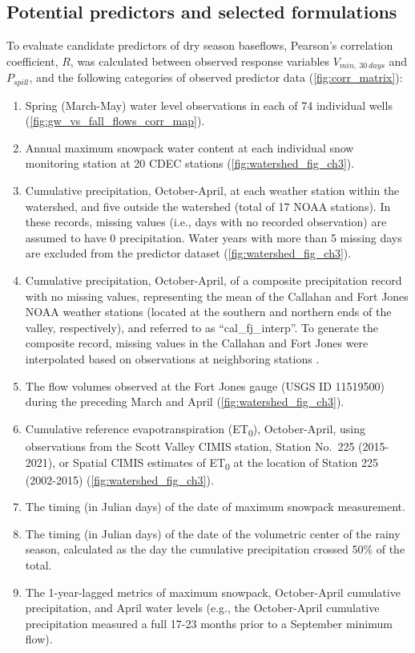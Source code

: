 \documentclass[hess, manuscript]{copernicus}
\providecommand{\tightlist}{%
  \setlength{\itemsep}{0pt}\setlength{\parskip}{0pt}}
\begin{document}
\subsection{Potential predictors and selected formulations}

To evaluate candidate predictors of dry season baseflows, Pearson's
correlation coefficient, \(R\), was calculated between observed response
variables \(V_{min,~30~days}\) and \(P_{spill}\), and the following
categories of observed predictor data (\autoref{fig:corr_matrix}):

\begin{enumerate}
\def\labelenumi{\arabic{enumi}.}
\tightlist
\item
  Spring (March-May) water level observations in each of 74 individual
  wells (\autoref{fig:gw_vs_fall_flows_corr_map}).
\item
  Annual maximum snowpack water content at each individual snow
  monitoring station at 20 CDEC stations
  (\autoref{fig:watershed_fig_ch3}).
\item
  Cumulative precipitation, October-April, at each weather station
  within the watershed, and five outside the watershed (total of 17 NOAA
  stations). In these records, missing values (i.e., days with no
  recorded observation) are assumed to have 0 precipitation. Water years
  with more than 5 missing days are excluded from the predictor dataset
  (\autoref{fig:watershed_fig_ch3}).
\item
  Cumulative precipitation, October-April, of a composite precipitation
  record with no missing values, representing the mean of the Callahan
  and Fort Jones NOAA weather stations (located at the southern and
  northern ends of the valley, respectively), and referred to as
  ``cal\_fj\_interp''. To generate the composite record, missing values
  in the Callahan and Fort Jones were interpolated based on observations
  at neighboring stations \citep[see method in][]{Foglia2013a}.
\item
  The flow volumes observed at the Fort Jones gauge (USGS ID 11519500)
  during the preceding March and April
  (\autoref{fig:watershed_fig_ch3}).
\item
  Cumulative reference evapotranspiration (ET\textsubscript{0}),
  October-April, using observations from the Scott Valley CIMIS station,
  Station No.~225 (2015-2021), or Spatial CIMIS estimates of
  ET\textsubscript{0} at the location of Station 225 (2002-2015)
  (\autoref{fig:watershed_fig_ch3}).
\item
  The timing (in Julian days) of the date of maximum snowpack
  measurement.
\item
  The timing (in Julian days) of the date of the volumetric center of
  the rainy season, calculated as the day the cumulative precipitation
  crossed 50\% of the total.
\item
  The 1-year-lagged metrics of maximum snowpack, October-April
  cumulative precipitation, and April water levels (e.g., the
  October-April cumulative precipitation measured a full 17-23 months
  prior to a September minimum flow).
\end{enumerate}
\end{document}
